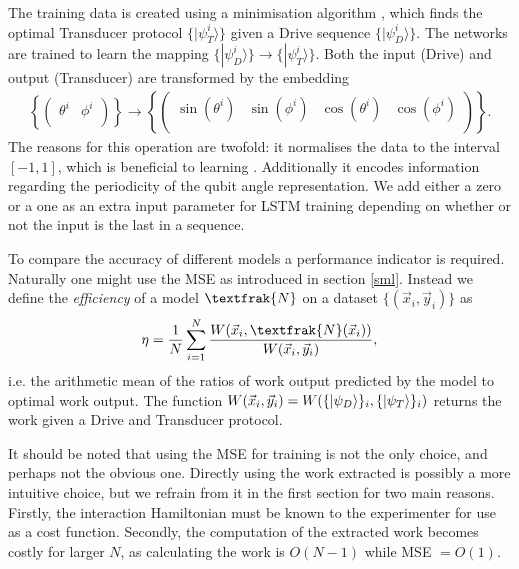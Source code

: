 The training data is created using a minimisation algorithm \cite{2020SciPy-NMeth}, which finds the optimal Transducer protocol $\{|\psi_T^i \rangle\}$ given a Drive sequence $\{|\psi_D^i \rangle\}$.
The networks are trained to learn the mapping $\{|\psi_D^i \rangle\} \to \{|\psi_T^i \rangle\}$.
Both the input (Drive) and output (Transducer) are transformed by the embedding
\begin{align*}
	\left\{
	\begin{pmatrix}
	\theta^i & \phi^i \\
	\end{pmatrix}
	\right\}
	\to
	\left\{
	\begin{pmatrix}
	\sin(\theta^i) & \sin(\phi^i) & \cos(\theta^i)  & \cos(\phi^i) \\
	\end{pmatrix}
	\right\}.
\end{align*}
The reasons for this operation are twofold: it normalises the data to the interval $[-1, 1]$, which is beneficial to learning \cite{LeCun2012}. Additionally it encodes information regarding the periodicity of the qubit angle representation.
We add either a zero or a one as an extra input parameter for LSTM training depending on whether or not the input is the last in a sequence.


To compare the accuracy of different models a performance indicator is required. 
Naturally one might use the MSE as introduced in section \ref{sml}.
Instead we define the \textit{efficiency} of a model $\textfrak{N}$ on a dataset $\{(\vec{x}_i, \vec{y}_i)\}$ as
\begin{align}
	\eta = \frac{1}{N} \sum_{i=1}^N \frac{W(\vec{x}_i,\textfrak{N}(\vec{x}_i))}{W(\vec{x}_i,\vec{y}_i)},
\end{align}
i.e. the arithmetic mean of the ratios of work output predicted by the model to optimal work output.
The function $W(\vec{x}_i, \vec{y}_i) = W(\{\ket{\psi_D}\}_i, \{\ket{\psi_T}\}_i)$ returns the work given a Drive and Transducer protocol.

It should be noted that using the MSE for training is not the only choice, and perhaps not the obvious one.
Directly using the work extracted is possibly a more intuitive choice, but we refrain from it in the first section for two main reasons.
Firstly, the interaction Hamiltonian must be known to the experimenter for use as a cost function.
Secondly, the computation of the extracted work becomes costly for larger $N$, as calculating the work is $O(N-1)$ while MSE $= O(1)$.
